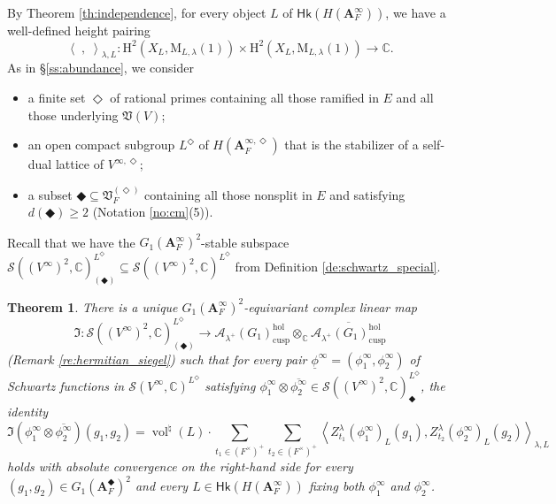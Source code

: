 \documentclass[12pt]{amsart}
\numberwithin{equation}{section}
\theoremstyle{plain}
\newtheorem{theorem}[proposition]{Theorem}
\theoremstyle{definition}
\theoremstyle{remark}
\renewcommand{\b}[1]{\mathbf{#1}}
\renewcommand{\c}[1]{\mathcal{#1}}
\renewcommand{\d}[1]{\mathbb{#1}}
\newcommand{\f}[1]{\mathfrak{#1}}
\renewcommand{\r}[1]{\mathrm{#1}}
\newcommand{\s}[1]{\mathscr{#1}}
\renewcommand{\sf}[1]{\mathsf{#1}}
\renewcommand{\(}{\left(}
\renewcommand{\)}{\right)}
\newcommand{\ol}[1]{\overline{#1}{}}
\newcommand{\ul}{\underline}
\renewcommand{\geq}{\geqslant}
\newcommand{\bA}{\b A}
\newcommand{\cA}{\c A}
\newcommand{\dC}{\d C}
\newcommand{\fI}{\f I}
\newcommand{\fV}{\f V}
\newcommand{\rH}{\r H}
\newcommand{\rM}{\r M}
\newcommand{\sS}{\s S}
\newcommand{\llangle}{\left\langle}
\newcommand{\rrangle}{\right\rangle}
\newcommand{\cusp}{\r{cusp}}
\newcommand{\hol}{\r{hol}}
\newcommand{\Hk}{\sf{Hk}}
\DeclareMathOperator{\vol}{vol}
\begin{document}
By Theorem \ref{th:independence}, for every object $L$ of $\Hk(H(\bA_F^\infty))$, we have a well-defined height pairing
\[
\llangle\;,\;\rrangle_{\lambda,L}\colon\rH^2(X_L,\rM_{L,\lambda}(1))\times\rH^2(X_L,\rM_{L,\lambda}(1))\to\dC.
\]
As in \S\ref{ss:abundance}, we consider
\begin{itemize}
  \item a finite set $\Diamond$ of rational primes containing all those ramified in $E$ and all those underlying $\fV(V)$;

  \item an open compact subgroup $L^\Diamond$ of $H(\bA^{\infty,\Diamond}_F)$ that is the stabilizer of a self-dual lattice of $V^{\infty,\Diamond}$;

  \item a subset $\Diamondblack\subseteq\fV_F^{(\Diamond)}$ containing all those nonsplit in $E$ and satisfying $d(\Diamondblack)\geq 2$ (Notation \ref{no:cm}(5)).
\end{itemize}
Recall that we have the $G_1(\bA_F^\infty)^2$-stable subspace $\sS((V^\infty)^2,\dC)^{L^\Diamond}_{(\Diamondblack)}\subseteq\sS((V^\infty)^2,\dC)^{L^\Diamond}$ from Definition \ref{de:schwartz_special}.





\begin{theorem}\label{th:modularity}
There is a unique $G_1(\bA_F^\infty)^2$-equivariant complex linear map
\[
\fI\colon\sS((V^\infty)^2,\dC)^{L^\Diamond}_{(\Diamondblack)}\to
\cA_{\lambda^+}(G_1)_\cusp^\hol\otimes_\dC\ol{\cA_{\lambda^+}(G_1)_\cusp^\hol}
\]
(Remark \ref{re:hermitian_siegel}) such that for every pair $\ul\phi^\infty=(\phi^\infty_1,\phi^\infty_2)$ of Schwartz functions in $\sS(V^\infty,\dC)^{L^\Diamond}$ satisfying $\phi^\infty_1\otimes\ol{\phi^\infty_2}\in\sS((V^\infty)^2,\dC)^{L^\Diamond}_\Diamondblack$, the identity
\[
\fI(\phi^\infty_1\otimes\ol{\phi^\infty_2})(g_1,g_2)=\vol^\natural(L)\cdot\sum_{t_1\in(F^\times)^+}\sum_{t_2\in(F^\times)^+}
\llangle Z^\lambda_{t_1}(\phi^\infty_1)_L(g_1),Z^\lambda_{t_2}(\phi^\infty_2)_L(g_2)\rrangle_{\lambda,L}
\]
holds with absolute convergence on the right-hand side for every $(g_1,g_2)\in G_1(\bA_F^\Diamondblack)^2$ and every $L\in\Hk(H(\bA_F^\infty))$ fixing both $\phi^\infty_1$ and $\phi^\infty_2$.
\end{theorem}
\end{document}
